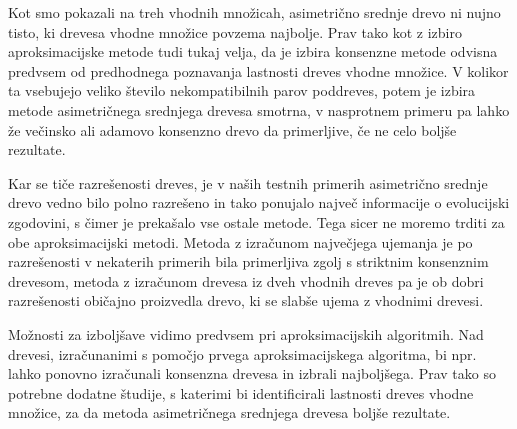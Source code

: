 \documentclass[a4paper, 12pt]{book}
\begin{document}
Kot smo pokazali na treh vhodnih množicah, asimetrično srednje drevo ni nujno tisto, ki drevesa vhodne množice povzema najbolje. Prav tako kot z izbiro aproksimacijske metode tudi tukaj velja, da je izbira konsenzne metode odvisna predvsem od predhodnega poznavanja lastnosti dreves vhodne množice. V kolikor ta vsebujejo veliko število nekompatibilnih parov poddreves, potem je izbira metode asimetričnega srednjega drevesa smotrna, v nasprotnem primeru pa lahko že večinsko ali adamovo konsenzno drevo da primerljive, če ne celo boljše rezultate.

Kar se tiče razrešenosti dreves, je v naših testnih primerih asimetrično srednje drevo vedno bilo polno razrešeno in tako ponujalo največ informacije o evolucijski zgodovini, s čimer je prekašalo vse ostale metode. Tega sicer ne moremo trditi za obe aproksimacijski metodi. Metoda z izračunom največjega ujemanja je po razrešenosti v nekaterih primerih bila primerljiva zgolj s striktnim konsenznim drevesom, metoda z izračunom drevesa iz dveh vhodnih dreves pa je ob dobri razrešenosti običajno proizvedla drevo, ki se slabše ujema z vhodnimi drevesi.

Možnosti za izboljšave vidimo predvsem pri aproksimacijskih algoritmih. Nad drevesi, izračunanimi s pomočjo prvega aproksimacijskega algoritma, bi npr. lahko ponovno izračunali konsenzna drevesa in izbrali najboljšega. Prav tako so potrebne dodatne študije, s katerimi bi identificirali lastnosti dreves vhodne množice, za da metoda asimetričnega srednjega drevesa boljše rezultate.
\end{document}
